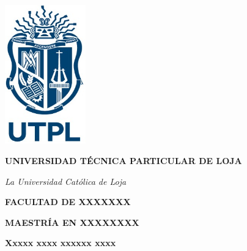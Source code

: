 \newcommand{\UTPLmotto}[1]{%
  {\bellmt\fontsize{16}{19.2}\itshape #1\par}%
}

\newcommand{\UTPLfaculty}{FACULTAD DE XXXXXXX}
\newcommand{\UTPLdegree}{MAESTRÍA EN XXXXXXXX}
\newcommand{\UTPLtitle}{Xxxxx xxxx xxxxxx xxxx}

\newcommand{\UTPLauthor}{Apellido1 Apellido2, Nombre1 Nombre2}
\newcommand{\UTPLadvisor}{Apellido1 Apellido2, Nombre1 Nombre2}

\newcommand{\UTPLcity}{LOJA}
\newcommand{\UTPLyear}{2025}


\begin{titlepage}
  \centering

  \includegraphics[width=3.5cm]{figures/logo_utpl.jpg}\par
  \vspace{1cm}

  {\fontsize{18}{21.6}\bfseries\MakeUppercase{Universidad Técnica Particular de Loja}\par}

  \UTPLmotto{La Universidad Católica de Loja}

  \vspace{1cm}

  {\fontsize{18}{21.6}\bfseries\MakeUppercase{\UTPLfaculty}\par}
  \vspace{1cm}
  {\fontsize{18}{21.6}\bfseries\MakeUppercase{\UTPLdegree}\par}

  \vspace{1cm}

  {\fontsize{16}{19.2}\bfseries \UTPLtitle\par}

  \vspace{1cm}


\end{titlepage}
